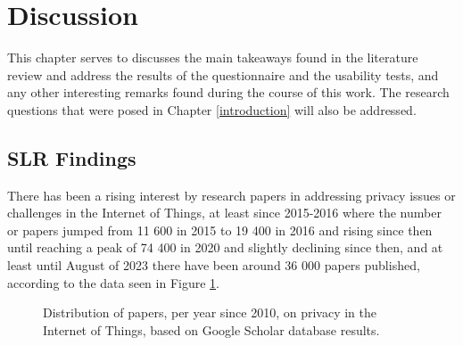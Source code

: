 %
%
\section{Discussion}\label{section:discussion}

\par
This chapter serves to discusses the main takeaways found in the literature
review and address the results of the questionnaire and the usability tests,
and any other interesting remarks found during the course of this work. The
research questions that were posed in Chapter \ref{introduction} will also
be addressed.

\subsection{SLR Findings}\label{subsection:slr_findings}

There has been a rising interest by research papers in addressing privacy
issues or challenges in the Internet of Things, at least since 2015-2016
where the number or papers jumped from 11 600 in 2015 to 19 400 in 2016
and rising since then until reaching a peak of 74 400 in 2020 and slightly
declining since then, and at least until August of 2023 there have been
around 36 000 papers published, according to the data seen in Figure \ref{fig:iotprivacy_papers}.

\begin{figure}
    \begin{center}
        \caption{Distribution of papers, per year since 2010, on privacy in the Internet of Things, based on Google Scholar database results.}
        \label{fig:iotprivacy_papers}
    \end{center}
\end{figure}

